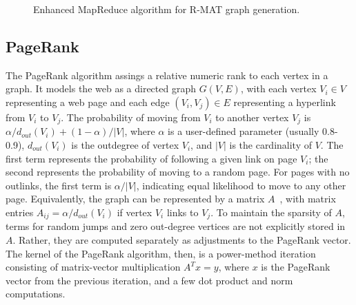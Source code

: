 \begin{figure}[htb]
 \begin{center}\end{center}

 \caption{Enhanced MapReduce algorithm for R-MAT graph generation.}

 \label{fig:rmat2}
\end{figure}

\subsection{PageRank}

The PageRank algorithm assings a relative numeric rank to each
vertex in a graph.
It models the web as a directed graph $G(V,E)$, with each vertex $V_i
\in V$ representing a web page and each edge $(V_i, V_j) \in E$
representing a hyperlink from $V_i$ to $V_j$.  The probability of
moving from $V_i$ to another vertex $V_j$ is $\alpha/d_{out}(V_i) +
(1-\alpha)/|V|$, where $\alpha$ is a user-defined parameter (usually
0.8-0.9), $d_{out}(V_i)$ is the outdegree of vertex $V_i$, and $|V|$ is
the cardinality of $V$.  The first term represents the probability of
following a given link on page $V_i$; the second represents the
probability of moving to a random page.  For pages with no outlinks,
the first term is $\alpha/|V|$, indicating equal likelihood to move to
any other page.  Equivalently, the graph can be represented by a
matrix $A$~\cite{LangvilleMeyer05a}, with matrix entries $A_{ij} =
\alpha/d_{out}(V_i)$ if vertex $V_i$ links to $V_j$.  To maintain the 
sparsity of $A$, terms for random jumps and zero out-degree vertices are
not explicitly stored in $A$.  Rather, they are computed separately
as adjustments to the PageRank vector.  The kernel of the PageRank
algorithm, then, is a power-method iteration consisting of 
matrix-vector multiplication $A^T x=y$,
where $x$ is the PageRank vector from the previous iteration, and
a few dot product and norm computations.


